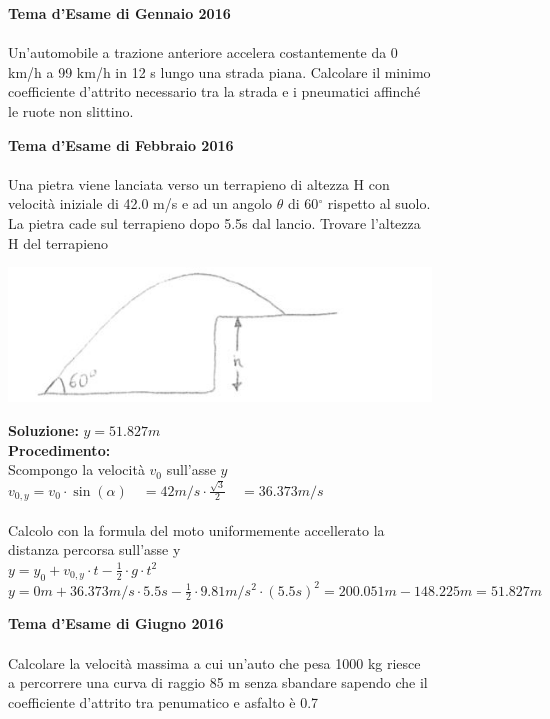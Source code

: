 
\begin{figure}[h!]
\textbf{Tema d'Esame di Gennaio 2016}\\ \\
Un’automobile a trazione anteriore accelera costantemente da 0 km/h a 99 km/h in 12 s
lungo una strada piana. Calcolare il minimo coefficiente d’attrito necessario tra la strada e i
pneumatici affinché le ruote non slittino.
\end{figure}


\begin{figure}[h!]
\textbf{Tema d'Esame di Febbraio 2016}\\ \\
Una pietra viene lanciata verso un terrapieno di altezza H con velocità iniziale di 42.0 m/s e ad un angolo $\theta$ di 60$^{\circ}$ rispetto al suolo. La pietra cade sul terrapieno dopo 5.5s dal lancio. Trovare l'altezza H del terrapieno
\\
	\begin{center}
		\includegraphics[scale=0.8]{ES1/FEB012016.jpg}
	\end{center}
\begin{boxed}
\null\hfill \textbf{Soluzione:} $y = 51.827 m$\\
\textbf{Procedimento: } \\
Scompongo la velocità $v_0$ sull'asse $y$\\
$v_{0,y}= v_0 \cdot \sin(\alpha) \quad = 42m/s\cdot \frac{\sqrt{3}}{2} \quad = 36.373m/s$ \\ \\
Calcolo con la formula del moto uniformemente accellerato la distanza percorsa sull'asse y \\
$y= y_0 + v_{0,y}\cdot t -\frac{1}{2}\cdot g \cdot t^2$\\
$y=0m+36.373m/s \cdot 5.5s -\frac{1}{2}\cdot 9.81 m/s^2 \cdot (5.5s)^2 = 200.051m - 148.225m = 51.827m$
\end{boxed}    
   
\end{figure}


\begin{figure}[h!]
\textbf{Tema d'Esame di Giugno 2016}\\ \\
Calcolare la velocità massima a cui un'auto che pesa 1000 kg riesce a percorrere una curva di raggio 85 m senza sbandare sapendo che il coefficiente d'attrito tra penumatico e asfalto è 0.7
\end{figure}


